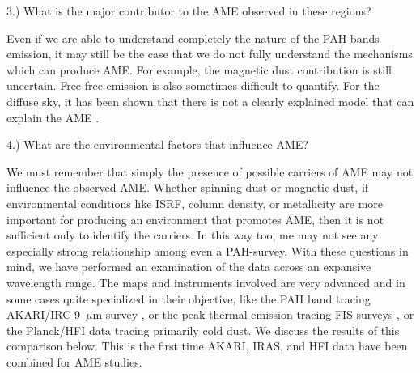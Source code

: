   3.) What is the major contributor to the AME observed in these regions?
  
  Even if we are able to understand completely the nature of the PAH bands emission, it may still be the case that we do not fully understand the mechanisms which can produce AME. For example, the magnetic dust contribution is still uncertain. Free-free emission is also sometimes difficult to quantify. For the diffuse sky, it has been shown that there is not a clearly explained model that can explain the AME \citep{hfi14viii}.
  
  4.) What are the environmental factors that influence AME?
  
     We must remember that simply the presence of possible carriers of AME may not influence the observed AME. Whether spinning dust or magnetic dust, if environmental conditions like ISRF, column density, or metallicity are more important for producing an environment that promotes AME, then it is not sufficient only to identify the carriers. In this way too, me may not see any especially strong relationship among even a PAH-survey. 
     With these questions in mind, we have performed an examination of the data across an expansive wavelength range. The maps and instruments involved are very advanced and in some cases quite specialized in their objective, like the PAH band tracing AKARI/IRC 9~$\mu$m survey \citep{irc07,ishihara10}, or the peak thermal emission tracing FIS surveys \citep{doi12}, or the Planck/HFI data tracing primarily cold dust. We discuss the results of this comparison below. This is the first time AKARI, IRAS, and HFI data have been combined for AME studies.
  
